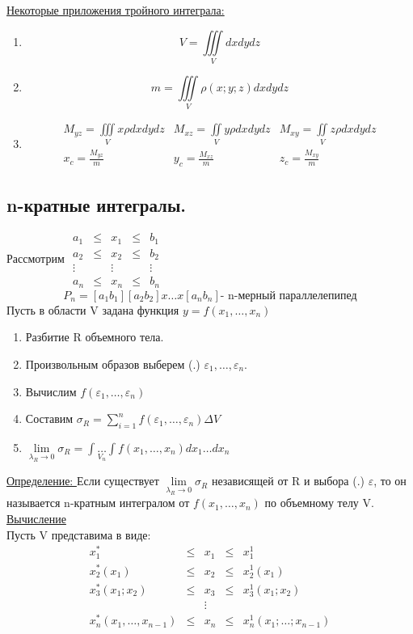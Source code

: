 \documentclass[12pt]{article}
\let\oldint\int
\let\oldiint\iint
\let\oldiiint\iiint
\let\oldsum\sum
\let\oldlim\lim
\renewcommand{\int}{\oldint\limits}
\renewcommand{\iint}{\oldiint\limits}
\renewcommand{\iiint}{\oldiiint\limits}
\renewcommand{\sum}{\oldsum\limits}
\renewcommand{\lim}{\oldlim\limits}
\begin{document}
  \vspace{1em}
  \par
  \underline{Некоторые приложения тройного интеграла:}
  \begin{enumerate}
    \item \[V=\iiint_V dxdydz\]
    \item \[m=\iiint_V \rho(x;y;z)dxdydz\]
    \item \[
    \begin{matrix}
      M_{yz} = \iiint_{V} x\rho dxdydz & M_{xz}=\iint_V y \rho dxdydz & M_{xy}=\iint_V z\rho dxdydz\\
      x_c = \frac{M_{yz}}{m} & y_c=\frac{M_{xz}}{m} & z_c=\frac{M_{xy}}{m}
    \end{matrix}
    \]
  \end{enumerate}
  \subsection{n-кратные интегралы.}
  Рассмотрим $
  \begin{matrix}
    a_1 &\leq &x_1 &\leq &b_1\\
    a_2 &\leq &x_2 &\leq &b_2\\
    \vdots & &\vdots & & \vdots\\
    a_n &\leq &x_n &\leq &b_n
  \end{matrix}
  $
  \[P_n=[a_1 b_1][a_2 b_2]x\dots x[a_n b_n] \text{- n-мерный параллелепипед}\]
  Пусть в области V задана функция $y=f(x_1,\dots,x_n)$
  \begin{enumerate}
    \item Разбитие R объемного тела.
    \item Произвольным образов выберем (.) $\varepsilon_1,\dots,\varepsilon_n$.
    \item Вычислим $f(\varepsilon_1,\dots,\varepsilon_n)$
    \item Составим $\sigma_R=\sum_{i=1}^{n} f(\varepsilon_1,\dots,\varepsilon_n)\Delta V$
    \item $\lim_{\lambda_R \to 0} \sigma_R = \int \underset{V_n}{\dots} \int f(x_1,\dots,x_n)dx_1 \dots dx_n$
  \end{enumerate}
  \underline{Определение: } Если существует $\lim_{\lambda_R \to 0} \sigma_R$ независящей от R и выбора (.) $\varepsilon$,
  то он называется n-кратным интегралом от $f(x_1,\dots,x_n)$ по объемному телу V.\\
  \underline{Вычисление}\\
  Пусть V представима в виде: 
  \[\begin{matrix}
    x_1^* &\leq& x_1& \leq& x_1^1\\
    x_2^*(x_1) &\leq&x_2 &\leq&x_2^1(x_1)\\
    x_3^*(x_1;x_2)&\leq& x_3 &\leq&x_3^1(x_1;x_2)\\
                  &&\vdots&&\\
    x_n^*(x_1,\dots,x_{n-1})&\leq&x_n&\leq&x_n^1(x_1;\dots;x_{n-1})
  \end{matrix}\]
\end{document}
